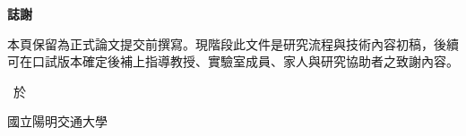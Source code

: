 \thispagestyle{empty}

\begin{center}
\Large
\textbf{誌\hspace{1cm}謝}
\end{center}

\vspace{1cm}
\linespread{2}
\selectfont

本頁保留為正式論文提交前撰寫。現階段此文件是研究流程與技術內容初稿，後續可在口試版本確定後補上指導教授、實驗室成員、家人與研究協助者之致謝內容。

\vspace{3cm}
\begin{flushright}
\studentCnName \ 於

國立陽明交通大學\ \NameofDepartmentInstituteCN

\ThesisDateTW
\end{flushright}
